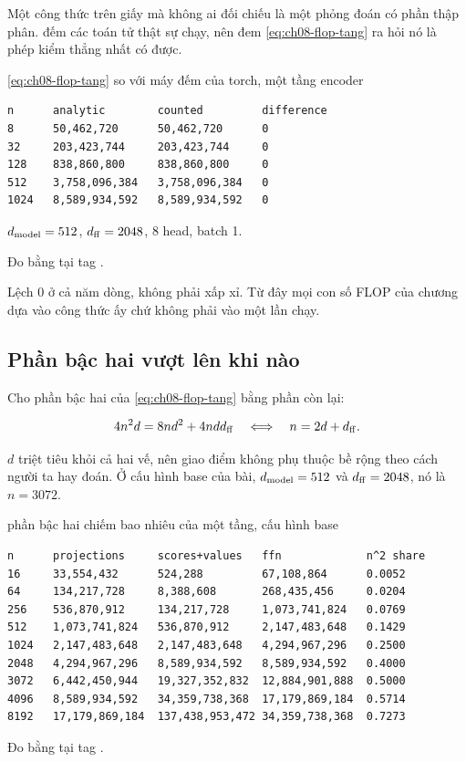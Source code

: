 %
Một công thức trên giấy mà không ai đối chiếu là một phỏng đoán có phần thập
phân.  đếm các toán tử thật sự
chạy, nên đem \eqref{eq:ch08-flop-tang} ra hỏi nó là phép kiểm thẳng nhất có
được.

\begin{measured}{\eqref{eq:ch08-flop-tang} so với máy đếm của torch, một tầng encoder}
\begin{verbatim}
n      analytic        counted         difference
8      50,462,720      50,462,720      0
32     203,423,744     203,423,744     0
128    838,860,800     838,860,800     0
512    3,758,096,384   3,758,096,384   0
1024   8,589,934,592   8,589,934,592   0
\end{verbatim}

\(d_{\mathrm{model}} = 512\), \(d_{\mathrm{ff}} = 2048\), 8 head, batch 1.

Đo bằng  tại tag .
\end{measured}

Lệch 0 ở cả năm dòng, không phải xấp xỉ. Từ đây mọi con số FLOP của chương dựa
vào công thức ấy chứ không phải vào một lần chạy.

\subsection*{Phần bậc hai vượt lên khi nào}

%
Cho phần bậc hai của \eqref{eq:ch08-flop-tang} bằng phần còn lại:

\begin{equation}
  4n^2 d = 8nd^2 + 4ndd_{\mathrm{ff}}
  \quad\Longleftrightarrow\quad
  n = 2d + d_{\mathrm{ff}} .
  \label{eq:ch08-giao-diem}
\end{equation}

\(d\) triệt tiêu khỏi cả hai vế, nên giao điểm không phụ thuộc bề rộng theo cách
người ta hay đoán. Ở cấu hình base của bài, \(d_{\mathrm{model}} = 512\) và
\(d_{\mathrm{ff}} = 2048\), nó là \(n = 3072\).

\begin{measured}{phần bậc hai chiếm bao nhiêu của một tầng, cấu hình base}
\begin{verbatim}
n      projections     scores+values   ffn             n^2 share
16     33,554,432      524,288         67,108,864      0.0052
64     134,217,728     8,388,608       268,435,456     0.0204
256    536,870,912     134,217,728     1,073,741,824   0.0769
512    1,073,741,824   536,870,912     2,147,483,648   0.1429
1024   2,147,483,648   2,147,483,648   4,294,967,296   0.2500
2048   4,294,967,296   8,589,934,592   8,589,934,592   0.4000
3072   6,442,450,944   19,327,352,832  12,884,901,888  0.5000
4096   8,589,934,592   34,359,738,368  17,179,869,184  0.5714
8192   17,179,869,184  137,438,953,472 34,359,738,368  0.7273
\end{verbatim}

Đo bằng  tại tag .
\end{measured}

